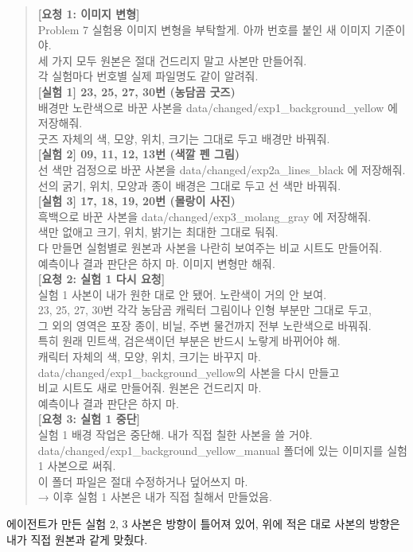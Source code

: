 \documentclass[11pt]{article}
\begin{document}
\begin{quote}\small
{\bfseries [요청 1: 이미지 변형]}\\
Problem 7 실험용 이미지 변형을 부탁할게. 아까 번호를 붙인 새 이미지 기준이야.\\
세 가지 모두 원본은 절대 건드리지 말고 사본만 만들어줘.\\
각 실험마다 번호별 실제 파일명도 같이 알려줘.\\[0.4em]
{\bfseries [실험 1] 23, 25, 27, 30번 (농담곰 굿즈)}\\
배경만 노란색으로 바꾼 사본을 data/changed/exp1\_background\_yellow 에 저장해줘.\\
굿즈 자체의 색, 모양, 위치, 크기는 그대로 두고 배경만 바꿔줘.\\[0.4em]
{\bfseries [실험 2] 09, 11, 12, 13번 (색깔 펜 그림)}\\
선 색만 검정으로 바꾼 사본을 data/changed/exp2a\_lines\_black 에 저장해줘.\\
선의 굵기, 위치, 모양과 종이 배경은 그대로 두고 선 색만 바꿔줘.\\[0.4em]
{\bfseries [실험 3] 17, 18, 19, 20번 (몰랑이 사진)}\\
흑백으로 바꾼 사본을 data/changed/exp3\_molang\_gray 에 저장해줘.\\
색만 없애고 크기, 위치, 밝기는 최대한 그대로 둬줘.\\[0.4em]
다 만들면 실험별로 원본과 사본을 나란히 보여주는 비교 시트도 만들어줘.\\
예측이나 결과 판단은 하지 마. 이미지 변형만 해줘.\\[0.6em]
{\bfseries [요청 2: 실험 1 다시 요청]}\\
실험 1 사본이 내가 원한 대로 안 됐어. 노란색이 거의 안 보여.\\
23, 25, 27, 30번 각각 농담곰 캐릭터 그림이나 인형 부분만 그대로 두고,\\
그 외의 영역은 포장 종이, 비닐, 주변 물건까지 전부 노란색으로 바꿔줘.\\
특히 원래 민트색, 검은색이던 부분은 반드시 노랗게 바뀌어야 해.\\
캐릭터 자체의 색, 모양, 위치, 크기는 바꾸지 마.\\
data/changed/exp1\_background\_yellow의 사본을 다시 만들고\\
비교 시트도 새로 만들어줘. 원본은 건드리지 마.\\
예측이나 결과 판단은 하지 마.\\[0.6em]
{\bfseries [요청 3: 실험 1 중단]}\\
실험 1 배경 작업은 중단해. 내가 직접 칠한 사본을 쓸 거야.\\
data/changed/exp1\_background\_yellow\_manual 폴더에 있는 이미지를 실험 1 사본으로 써줘.\\
이 폴더 파일은 절대 수정하거나 덮어쓰지 마.\\
→ 이후 실험 1 사본은 내가 직접 칠해서 만들었음.
\end{quote}
에이전트가 만든 실험 2, 3 사본은 방향이 틀어져 있어, 위에 적은 대로 사본의
방향은 내가 직접 원본과 같게 맞췄다.
\end{document}
